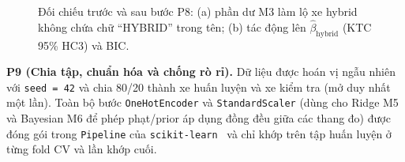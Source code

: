 \begin{figure}[htbp]
  \centering
  
  \caption{Đối chiếu trước và sau bước P8: (a) phần dư M3 làm lộ \nHybridMissed{} xe hybrid không chứa chữ ``HYBRID'' trong tên; (b) tác động lên $\hat\beta_{\mathrm{hybrid}}$ (KTC 95\% HC3) và BIC.}
  \label{fig:hybrid-fix}
\end{figure}

\textbf{P9 (Chia tập, chuẩn hóa và chống rò rỉ).} Dữ liệu được hoán vị ngẫu nhiên với \texttt{seed = 42} và chia 80/20 thành \nTrain{} xe huấn luyện và \nTest{} xe kiểm tra (mở duy nhất một lần). Toàn bộ bước \texttt{OneHotEncoder} và \texttt{StandardScaler} (dùng cho Ridge M5 và Bayesian M6 để phép phạt/prior áp dụng đồng đều giữa các thang đo) được đóng gói trong \texttt{Pipeline} của \texttt{scikit-learn}~\cite{pedregosa2011sklearn} và chỉ khớp trên tập huấn luyện ở từng fold CV và lần khớp cuối.
